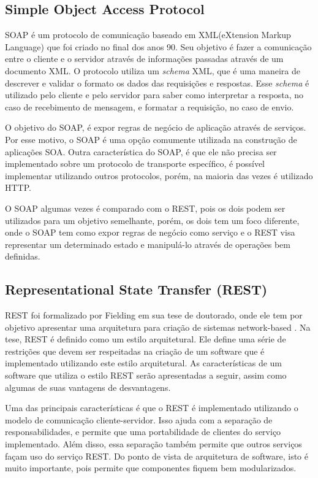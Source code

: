 \subsection{Simple Object Access Protocol}
SOAP é um protocolo de comunicação baseado em XML(eXtension Markup Language) que foi criado no final 
dos anos 90. Seu objetivo é fazer a comunicação entre o cliente e o servidor através de informações 
passadas através de um documento XML. O protocolo utiliza um \textit{schema} XML, que é uma 
maneira de descrever e validar o formato os dados das requisições e respostas. 
Esse \textit{schema} é utilizado pelo cliente e pelo servidor para saber como interpretar a resposta, 
no caso de recebimento de mensagem, e formatar a requisição, no caso de envio.

O objetivo do SOAP, é expor regras de negócio de aplicação através de serviços. 
Por esse motivo, o SOAP é uma opção comumente utilizada na construção de aplicações SOA. 
Outra característica do SOAP, é que ele não precisa ser implementado sobre um protocolo de 
transporte específico, é possível implementar utilizando outros protocolos, porém, 
na maioria das vezes é utilizado HTTP.

O SOAP algumas vezes é comparado com o REST, pois os dois podem ser utilizados para um objetivo 
semelhante, porém, os dois tem um foco diferente, onde o SOAP tem como expor regras de negócio 
como serviço e o REST visa representar um determinado estado e manipulá-lo através de operações 
bem definidas.

\subsection{Representational State Transfer (REST)}
REST foi formalizado por Fielding \cite{fielding} em sua tese de doutorado, onde ele tem por 
objetivo apresentar uma arquitetura para criação de sistemas network-based . 
Na tese, REST é definido como um estilo arquitetural. Ele define uma série de restrições que devem ser 
respeitadas na criação de um software que é implementado utilizando este estilo arquitetural. 
As características de um software que utiliza o estilo REST serão apresentadas a seguir, assim 
como algumas de suas vantagens de desvantagens.

Uma das principais características é que o REST é implementado utilizando o modelo de comunicação 
cliente-servidor. Isso ajuda com a separação de responsabilidades, e permite que uma portabilidade 
de clientes do serviço implementado. Além disso, essa separação também permite que outros serviços 
façam uso do serviço REST. Do ponto de vista de arquitetura de software, isto é muito importante, 
pois permite que componentes fiquem bem modularizados.


